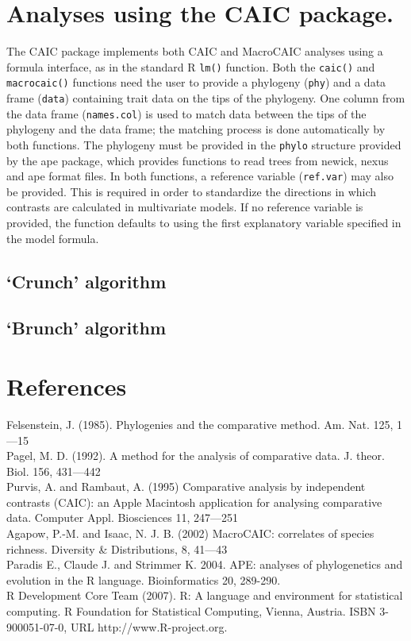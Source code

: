 \documentclass[a4paper]{article}
\begin{document}
\section{Analyses using the CAIC package.}

The CAIC package implements both CAIC and MacroCAIC analyses using a formula interface, as in the standard R \texttt{lm()} function. Both the \texttt{caic()} and \texttt{macrocaic()} functions need the user to provide a phylogeny (\texttt{phy}) and a data frame (\texttt{data}) containing trait data on the tips of the phylogeny. One column from the data frame (\texttt{names.col}) is used to match data between the tips of the phylogeny and the data frame; the matching process is done automatically by both functions. The phylogeny must be provided in the \texttt{phylo} structure provided by the ape package, which provides functions to read trees from newick, nexus and ape format files. In both functions, a reference variable (\texttt{ref.var}) may also be provided. This is required in order to standardize the directions in which contrasts are calculated in multivariate models. If no reference variable is provided, the function defaults to using the first explanatory variable specified in the model formula. 

\subsection{`Crunch' algorithm}


\subsection{`Brunch' algorithm}







\section{References}
Felsenstein, J.  (1985).  Phylogenies and the comparative method.  Am. Nat.  125, 1---15\\
Pagel, M. D. (1992). A method for the analysis of comparative data.  J. theor. Biol. 156, 431---442\\
Purvis, A. and Rambaut, A. (1995) Comparative analysis by independent contrasts (CAIC): an Apple Macintosh application for analysing comparative data.  Computer Appl. Biosciences 11, 247---251\\
Agapow, P.-M. and Isaac, N. J. B. (2002) MacroCAIC: correlates of species richness. Diversity \& Distributions, 8, 41---43\\
Paradis E., Claude J. and Strimmer K. 2004. APE: analyses of phylogenetics and evolution in the R language.  Bioinformatics 20, 289-290.\\
R Development Core Team (2007). R: A language and environment for statistical computing. R Foundation for  Statistical Computing, Vienna, Austria. ISBN 3-900051-07-0, URL http://www.R-project.org.\\
\end{document}
